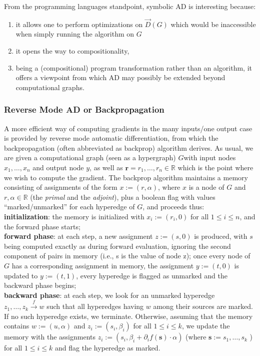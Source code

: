 From the programming languages standpoint, symbolic AD is interesting because:
\begin{enumerate} 
	\item it allows one to perform optimizations on $\stackrel{\rightarrow}{D}(G)$ which would be inaccessible when simply running the 			algorithm on $G$
	\item it opens the way to compositionality,
	\item being a (compositional) program transformation rather than an algorithm, it oﬀers a viewpoint from which
	AD may possibly be extended beyond computational graphs.
\end{enumerate}

\subsubsection{Reverse Mode AD or Backpropagation}
A more eﬃcient way of computing gradients in the many inputs/one output case is provided by reverse mode automatic
diﬀerentiation, from which the backpropagation (often abbreviated as backprop) algorithm derives. As usual, we are
given a computational graph (seen as a hypergraph) $G $with input nodes $x_1 , \dots , x_n$ and output node $y$, as well as
$\mathbf{r}= r_1 , \dots , r_n \in \mathbb{R}$ which is the point where we wish to compute the gradient. The backprop algorithm maintains a memory consisting of assignments of the form $x := (r, \alpha)$, where $x$ is a node of $G$ and $r, \alpha \in \mathbb{R}$ (the \emph{primal} and the \emph{adjoint}), plus a boolean ﬂag with values “marked/unmarked” for each hyperedge of $G$, and proceeds thus:\\ 

\noindent \textbf{initialization}: the memory is initialized with $x_i := (r_ i , 0)$ for all $1 \leq i \leq n$, and the forward phase starts;\\

\noindent\textbf{forward phase}: at each step, a new assignment $z := (s, 0)$ is produced, with $s$ being computed exactly as during
forward evaluation, ignoring the second component of pairs in memory (i.e., s is the value of node z); once
every node of $G$ has a corresponding assignment in memory, the assignment $y := (t, 0)$ is updated to $y := (t, 1)$,
every hyperedge is ﬂagged as unmarked and the backward phase begins;\\

\noindent\textbf{backward phase}: at each step, we look for an unmarked hyperedge $z _1 ,\dots, z_k \xrightarrow{f} w$ such that all hyperedges having $w$ among their sources are marked. If no such hyperedge exists, we terminate. Otherwise, assuming
that the memory contains $w := (u, \alpha)$ and $z_i := (s_i , \beta_i )$ for all $1 \leq i \leq k$, we update the memory with the
assignments $z_i := (s_i , \beta_i + \partial_i f(\mathbf{s}) \cdot \alpha)$ (where $\mathbf{s}:= s_1 , \dots , s_k$ ) for all $1 \leq i \leq k$ and ﬂag the hyperedge as marked.

